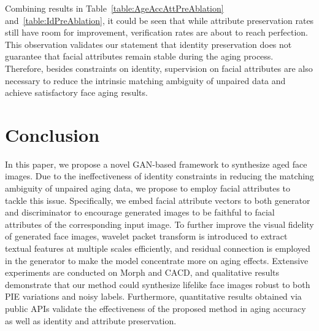 \documentclass[letterpaper]{article} %
\begin{document}
Combining results in Table~\ref{table:AgeAccAttPreAblation} and~\ref{table:IdPreAblation}, it could be seen that while attribute preservation rates still have room for improvement, verification rates are about to reach perfection.
This observation validates our statement that identity preservation does not guarantee that facial attributes remain stable during the aging process.
Therefore, besides constraints on identity, supervision on facial attributes are also necessary to reduce the intrinsic matching ambiguity of unpaired data and achieve satisfactory face aging results.

\section{Conclusion}
In this paper, we propose a novel GAN-based framework to synthesize aged face images. Due to the ineffectiveness of identity constraints in reducing the matching ambiguity of unpaired aging data, we propose to employ facial attributes to tackle this issue. 
Specifically, we embed facial attribute vectors to both generator and discriminator to encourage generated images to be faithful to facial attributes of the corresponding input image. 
To further improve the visual fidelity of generated face images, wavelet packet transform is introduced to extract textual features at multiple scales efficiently, and residual connection is employed in the generator to make the model concentrate more on aging effects. 
Extensive experiments are conducted on Morph and CACD, and qualitative results demonstrate that our method could synthesize lifelike face images robust to both PIE variations and noisy labels. 
Furthermore, quantitative results obtained via public APIs validate the effectiveness of the proposed method in aging accuracy as well as identity and attribute preservation.



\end{document}
